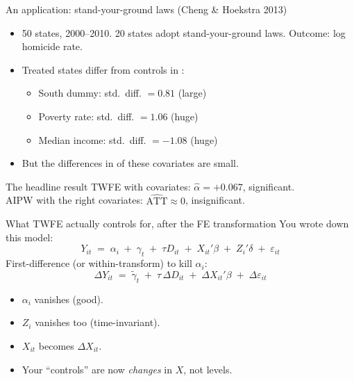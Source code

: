 \documentclass[aspectratio=169,11pt]{beamer}
\begin{document}
\begin{frame}{An application: stand-your-ground laws (Cheng \& Hoekstra 2013)}
\vspace{0.5em}
\begin{itemize}\small
  \item 50 states, 2000--2010. 20 states adopt stand-your-ground laws. Outcome: log homicide rate.
  \item Treated states differ from controls in :
  \begin{itemize}\small
    \item[--] South dummy: std.\ diff. $= 0.81$  (large)
    \item[--] Poverty rate:  std.\ diff. $= 1.06$  (huge)
    \item[--] Median income: std.\ diff. $= -1.08$ (huge)
  \end{itemize}
  \item But the differences in  of these covariates are small.
\end{itemize}
\vspace{0.6em}
\begin{block}{The headline result}
\small
TWFE with covariates: \;\;$\widehat{\alpha} = +0.067$, \;significant. \\
AIPW with the right covariates: \;$\widehat{\text{ATT}} \approx 0$, insignificant.\\[0.3em]
\end{block}
\end{frame}

\begin{frame}{What TWFE actually controls for, after the FE transformation}
\vspace{0.4em}
You wrote down this model:
\vspace{-0.1em}
\[
Y_{it} \;=\; \alpha_i \;+\; \gamma_t \;+\; \tau D_{it} \;+\; X_{it}'\beta \;+\; Z_i'\delta \;+\; \varepsilon_{it}
\]
\vspace{0.1em}
First-difference (or within-transform) to kill $\alpha_i$:
\vspace{-0.2em}
\[
\Delta Y_{it} \;=\; \widetilde{\gamma}_t \;+\; \tau\, \Delta D_{it} \;+\; \Delta X_{it}'\beta \;+\; \Delta \varepsilon_{it}
\]
\vspace{0.1em}
\begin{itemize}\small
  \item $\alpha_i$ vanishes (good).
  \item $Z_i$ vanishes too (time-invariant). 
  \item $X_{it}$ becomes $\Delta X_{it}$. 
  \item Your ``controls'' are now \textit{changes} in $X$, not levels.
\end{itemize}
\end{frame}
\end{document}
